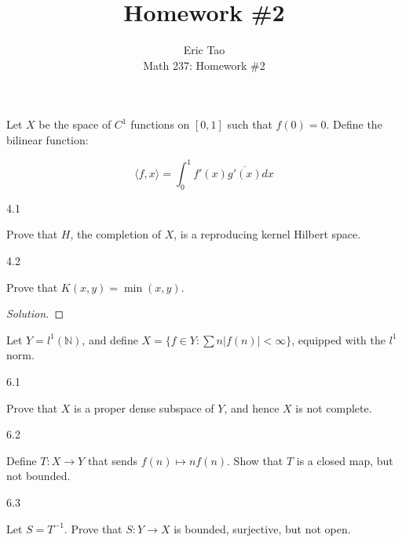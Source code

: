 \documentclass[10pt]{article}
\newenvironment{problem}[2][]{\begin{trivlist}
\item[\hskip \labelsep {\bfseries #1}\hskip \labelsep {\bfseries #2.}]}{\end{trivlist}}
\begin{document}
 
\title{Homework \#2}
\author{Eric Tao\\
Math 237: Homework \#2}
\maketitle

\begin{problem}{Question 4}

Let $X$ be the space of $C^1$ functions on $[0,1]$ such that $f(0) = 0$. Define the bilinear function:

$$\langle f, x \rangle = \int_0^1 f'(x) \overline{g'(x)} dx$$

4.1

Prove that $H$, the completion of $X$, is a reproducing kernel Hilbert space.

4.2

Prove that $K(x,y) = \min(x,y)$.

\end{problem}
\begin{proof}[Solution]

\end{proof}

\begin{problem}{Question 6}

Let $Y = l^1(\mathbb{N})$, and define $X = \{ f \in Y : \sum n |f(n)| < \infty \}$, equipped with the $l^1$ norm.

6.1

Prove that $X$ is a proper dense subspace of $Y$, and hence $X$ is not complete. 

6.2

Define $T: X \to Y$ that sends $f(n) \mapsto nf(n)$. Show that $T$ is a closed map, but not bounded.

6.3

Let $S = T^{-1}$. Prove that $S: Y \to X$ is bounded, surjective, but not open.

\end{problem}
\end{document}
